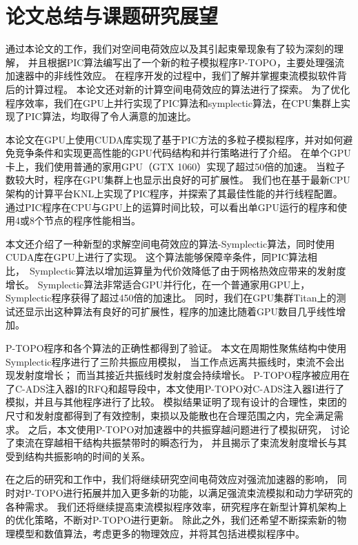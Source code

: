 
\chapter{论文总结与课题研究展望}
\label{chap:conclusion}
通过本论文的工作，我们对空间电荷效应以及其引起束晕现象有了较为深刻的理解，
并且根据PIC算法编写出了一个新的粒子模拟程序P-TOPO，主要处理强流加速器中的非线性效应。
在程序开发的过程中，我们了解并掌握束流模拟软件背后的计算过程。
本论文还对新的计算空间电荷效应的算法进行了探索。
为了优化程序效率，我们在GPU上并行实现了PIC算法和symplectic算法，在CPU集群上实现了PIC算法，均取得了令人满意的加速比。

本论文在GPU上使用CUDA库实现了基于PIC方法的多粒子模拟程序，并对如何避免竞争条件和实现更高性能的GPU代码结构和并行策略进行了介绍。
在单个GPU卡上，我们使用普通的家用GPU（GTX 1060）实现了超过50倍的加速。
当粒子数较大时，程序在GPU集群上也显示出良好的可扩展性。
我们也在基于最新CPU架构的计算平台KNL上实现了PIC程序，并探索了其最佳性能的并行线程配置。
通过PIC程序在CPU与GPU上的运算时间比较，可以看出单GPU运行的程序和使用4或8个节点的程序性能相当。

本文还介绍了一种新型的求解空间电荷效应的算法-Symplectic算法，同时使用CUDA库在GPU上进行了实现。
这个算法能够保障辛条件，同PIC算法相比，~Symplectic算法以增加运算量为代价效降低了由于网格热效应带来的发射度增长。
Symplectic算法非常适合GPU并行化，在一个普通家用GPU上，Symplectic程序获得了超过450倍的加速比。
同时，我们在GPU集群Titan上的测试还显示出这种算法有良好的可扩展性，程序的加速比随着GPU数目几乎线性增加。

P-TOPO程序和各个算法的正确性都得到了验证。
本文在周期性聚焦结构中使用Symplectic程序进行了三阶共振应用模拟，
当工作点远离共振线时，束流不会出现发射度增长；
而当其接近共振线时发射度会持续增长。
P-TOPO程序被应用在了C-ADS注入器I的RFQ和超导段中，本文使用P-TOPO对C-ADS注入器I进行了模拟，并且与其他程序进行了比较。
模拟结果证明了现有设计的合理性，束团的尺寸和发射度都得到了有效控制，束损以及能散也在合理范围之内，完全满足需求。
之后，本文使用P-TOPO对加速器中的共振穿越问题进行了模拟研究，
讨论了束流在穿越相干结构共振禁带时的瞬态行为，
并且揭示了束流发射度增长与其受到结构共振影响的时间的关系。

在之后的研究和工作中，我们将继续研究空间电荷效应对强流加速器的影响，
同时对P-TOPO进行拓展并加入更多新的功能，以满足强流束流模拟和动力学研究的各种需求。
我们还将继续提高束流模拟程序效率，研究程序在新型计算机架构上的优化策略，不断对P-TOPO进行更新。
除此之外，我们还希望不断探索新的物理模型和数值算法，考虑更多的物理效应，并将其包括进模拟程序中。